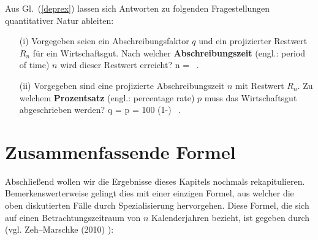 \medskip
\noindent
Aus Gl.~(\ref{deprex}) lassen sich Antworten zu folgenden
Fragestellungen quantitativer Natur ableiten:

%
\begin{itemize}

\item[(i)] Vorgegeben seien ein Abschreibungsfaktor $q$ und
ein projizierter Restwert $R_{n}$ f\"ur ein Wirtschaftsgut.
Nach welcher {\bf Abschreibungszeit} (engl.: period of time) $n$ 
wird dieser Restwert erreicht?
%
\be
n =  \ .
\ee
%

\item[(ii)] Vorgegeben sind eine projizierte Abschreibungszeit
$n$ mit Restwert $R_{n}$. Zu welchem {\bf Prozentsatz} (engl.: 
percentage rate) $p$ muss das Wirtschaftsgut abgeschrieben werden?
%
\be
q = 
\quad\Rightarrow\quad
p = 100 \cdot \left(1-\right) \ .
\ee
%

\end{itemize}
%

\section[Zusammenfassende Formel]{Zusammenfassende Formel}
Abschlie\ss end wollen wir die Ergebnisse dieses Kapitels nochmals
rekapitulieren. Bemerkenswerterweise gelingt dies mit einer
einzigen Formel, aus welcher die oben diskutierten F\"alle durch
Spezialisierung hervorgehen. Diese Formel, die sich auf einen
Betrachtungszeitraum von $n$ Kalenderjahren bezieht, ist gegeben
durch (vgl. Zeh--Marschke (2010) ):
%
\be
{}
\ee
%


